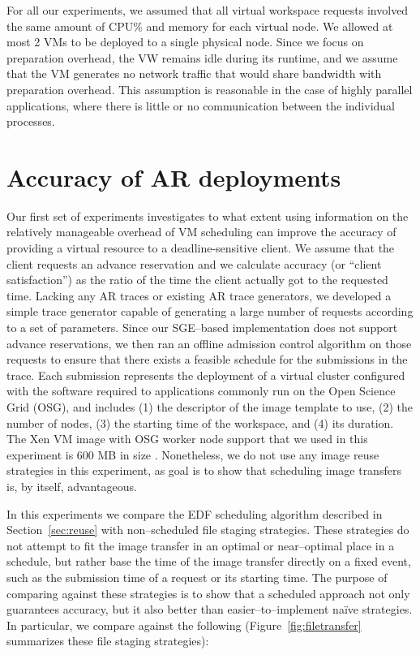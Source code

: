 For all our experiments, we assumed that all virtual workspace requests
involved the same amount of CPU\% and memory for each virtual node. We
allowed at most 2 VMs to be deployed to a single physical node. Since
we focus on preparation overhead, the VW remains idle during its
runtime, and we assume that the VM generates no network traffic that
would share bandwidth with preparation overhead. This assumption is
reasonable in the case of highly parallel applications, where there is little or no communication between the individual processes.


\section{Accuracy of AR deployments}


Our first set of experiments investigates to what extent using
information on the relatively manageable overhead of VM scheduling can
improve the accuracy of providing a virtual resource to a
deadline{}-sensitive client. We assume that the client requests an advance reservation and we calculate accuracy (or
``client satisfaction'') as the ratio of the time the client actually
got to the requested time. Lacking any AR traces or existing AR trace generators,
we developed a simple trace generator capable of generating a large
number of requests according to a set of parameters. Since our SGE--based implementation does not support advance reservations, we then ran an
offline admission control algorithm on those requests to ensure that there exists a feasible
schedule for the submissions in the trace. Each submission represents
the deployment of a virtual cluster configured with the software
required to applications commonly run on the Open Science Grid (OSG),
and includes (1) the descriptor of the image template to use, (2) the
number of nodes, (3) the starting time of the workspace, and (4) its
duration. The Xen VM image with OSG worker node support that we used in
this experiment is 600 MB in size \cite{DBLP:conf/ccgrid/FosterFKSSZ06}. Nonetheless, we do not use any image reuse strategies in this experiment, as goal is to show that scheduling image transfers is, by itself, advantageous.

In this experiments we compare the EDF scheduling algorithm described in Section~\ref{sec:reuse} with non--scheduled file staging strategies. These strategies do not attempt to fit the image transfer in an optimal or near--optimal place in a schedule, but rather base the time of the image transfer directly on a fixed event, such as the submission time of a request or its starting time. The purpose of comparing against these strategies is to show that a scheduled approach not only guarantees accuracy, but it also better than easier--to--implement na\"ive strategies. In particular, we compare against the following (Figure~\ref{fig:filetransfer} summarizes these file staging strategies):

